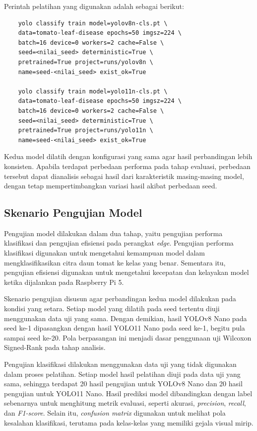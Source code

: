 \begin{sectioncontent}
\begin{subsectioncontent}
    Perintah pelatihan yang digunakan adalah sebagai berikut:

    \begin{verbatim}
    yolo classify train model=yolov8n-cls.pt \
    data=tomato-leaf-disease epochs=50 imgsz=224 \
    batch=16 device=0 workers=2 cache=False \
    seed=<nilai_seed> deterministic=True \
    pretrained=True project=runs/yolov8n \
    name=seed-<nilai_seed> exist_ok=True

    yolo classify train model=yolo11n-cls.pt \
    data=tomato-leaf-disease epochs=50 imgsz=224 \
    batch=16 device=0 workers=2 cache=False \
    seed=<nilai_seed> deterministic=True \
    pretrained=True project=runs/yolo11n \
    name=seed-<nilai_seed> exist_ok=True
    \end{verbatim}

    Kedua model dilatih dengan konfigurasi yang sama agar hasil perbandingan lebih konsisten. Apabila terdapat perbedaan performa pada tahap evaluasi, perbedaan tersebut dapat dianalisis sebagai hasil dari karakteristik masing-masing model, dengan tetap mempertimbangkan variasi hasil akibat perbedaan seed.
\end{subsectioncontent}

\subsection{Skenario Pengujian Model}
\begin{subsectioncontent}
    \hspace{\parindent}Pengujian model dilakukan dalam dua tahap, yaitu pengujian performa klasifikasi dan pengujian efisiensi pada perangkat \textit{edge}. Pengujian performa klasifikasi digunakan untuk mengetahui kemampuan model dalam mengklasifikasikan citra daun tomat ke kelas yang benar. Sementara itu, pengujian efisiensi digunakan untuk mengetahui kecepatan dan kelayakan model ketika dijalankan pada Raspberry Pi 5.

    Skenario pengujian disusun agar perbandingan kedua model dilakukan pada kondisi yang setara. Setiap model yang dilatih pada seed tertentu diuji menggunakan data uji yang sama. Dengan demikian, hasil YOLOv8 Nano pada seed ke-1 dipasangkan dengan hasil YOLO11 Nano pada seed ke-1, begitu pula sampai seed ke-20. Pola berpasangan ini menjadi dasar penggunaan uji Wilcoxon Signed-Rank pada tahap analisis.

    Pengujian klasifikasi dilakukan menggunakan data uji yang tidak digunakan dalam proses pelatihan. Setiap model hasil pelatihan diuji pada data uji yang sama, sehingga terdapat 20 hasil pengujian untuk YOLOv8 Nano dan 20 hasil pengujian untuk YOLO11 Nano. Hasil prediksi model dibandingkan dengan label sebenarnya untuk menghitung metrik evaluasi, seperti akurasi, \textit{precision}, \textit{recall}, dan \textit{F1-score}. Selain itu, \textit{confusion matrix} digunakan untuk melihat pola kesalahan klasifikasi, terutama pada kelas-kelas yang memiliki gejala visual mirip.


\end{subsectioncontent}
\end{sectioncontent}
